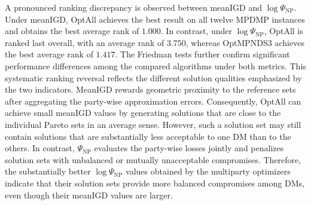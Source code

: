 \documentclass[journal]{IEEEtran}
\begin{document}
A pronounced ranking discrepancy is observed between meanIGD and $\log\Psi_{\mathrm{NP}}$. Under meanIGD, OptAll achieves the best result on all twelve MPDMP instances and obtains the best average rank of $1.000$. In contrast, under $\log\Psi_{\mathrm{NP}}$, OptAll is ranked last overall, with an average rank of $3.750$, whereas OptMPNDS3 achieves the best average rank of $1.417$. The Friedman tests further confirm significant performance differences among the compared algorithms under both metrics. This systematic ranking reversal reflects the different solution qualities emphasized by the two indicators. MeanIGD rewards geometric proximity to the reference sets after aggregating the party-wise approximation errors. Consequently, OptAll can achieve small meanIGD values by generating solutions that are close to the individual Pareto sets in an average sense. However, such a solution set may still contain solutions that are substantially less acceptable to one DM than to the others. In contrast, $\Psi_{\mathrm{NP}}$ evaluates the party-wise losses jointly and penalizes solution sets with unbalanced or mutually unacceptable compromises. Therefore, the substantially better $\log\Psi_{\mathrm{NP}}$ values obtained by the multiparty optimizers indicate that their solution sets provide more balanced compromises among DMs, even though their meanIGD values are larger.
\end{document}
